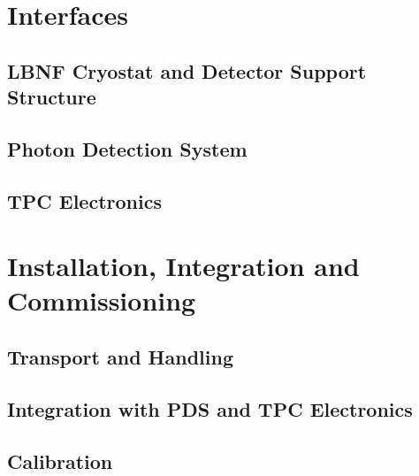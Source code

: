 \section{Interfaces}
\label{sec:fdsp-apa-intfc}

 



\subsection{LBNF Cryostat and Detector Support Structure}
\label{sec:fdsp-apa-intfc-lbnf-dss}


\subsection{Photon Detection System}
\label{sec:fdsp-apa-intfc-pds}


\subsection{TPC Electronics}
\label{sec:fdsp-apa-intfc-elec}




\section{Installation, Integration and Commissioning}
\label{sec:fdsp-apa-install}

\subsection{Transport and Handling}
\label{sec:fdsp-apa-install-transport}


\subsection{Integration with PDS and TPC Electronics}
\label{sec:fdsp-apa-install-pds-elec}


\subsection{Calibration}
\label{sec:fdsp-apa-install-calib}




